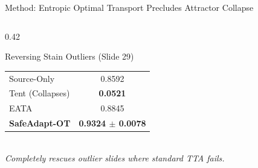 \documentclass[aspectratio=169,10pt]{beamer}
\begin{document}
\begin{frame}{Method: Entropic Optimal Transport Precludes Attractor Collapse}
\begin{columns}[T]
\begin{column}{0.42\textwidth}
\begin{block}{Reversing Stain Outliers (Slide 29)}
\begin{tabular}{lc}
                    \midrule
                    Source-Only & 0.8592 \\
                    Tent (Collapses) & \alert{\textbf{0.0521}} \\
                    EATA & 0.8845 \\
                    \textbf{SafeAdapt-OT} & \textbf{\textcolor{MedGreen}{0.9324 $\pm$ 0.0078}} \\
                    \bottomrule
                \end{tabular}
                \vspace{0.1cm}\\
                \textit{Completely rescues outlier slides where standard TTA fails.}
            \end{block}
        \end{column}
    \end{columns}
\end{frame}
\end{document}

